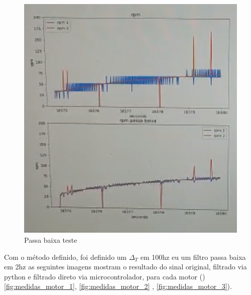 \begin{figure}[h]
	\centering
	\includegraphics{figures/passa_baixa_teste}
	\caption{Passa baixa teste}
	\label{fig:passa_baixa_teste}
\end{figure}

Com o método definido, foi definido um $\Delta_{T}$ em 100hz eu um filtro passa baixa em 2hz
as seguintes imagens mostram o resultado do sinal original, filtrado via python e 
filtrado direto via microcontrolador, para cada motor ()\ref{fig:medidas_motor_1},  \ref{fig:medidas_motor_2} , \ref{fig:medidas_motor_3}).


